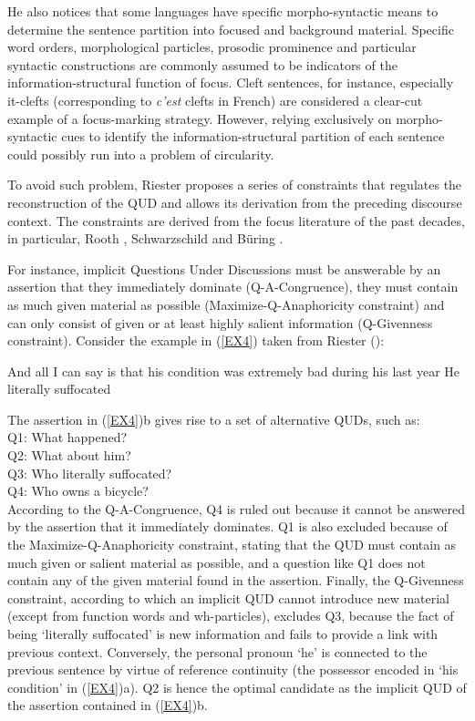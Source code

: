 \documentclass[12pt]{report}
\begin{document}
He also notices that some languages have specific morpho-syntactic means to determine the sentence partition into focused and background material. Specific word orders, morphological particles, prosodic prominence and particular syntactic constructions are commonly assumed to be indicators of the information-structural function of focus. Cleft sentences, for instance, especially it-clefts (corresponding to \textit{c’est} clefts in French) are considered a clear-cut example of a focus-marking strategy. However, relying exclusively on morpho-syntactic cues to identify the information-structural partition of each sentence could possibly run into a problem of circularity.


To avoid such problem, Riester proposes a series of constraints that regulates the reconstruction of the QUD and allows its derivation from the preceding discourse context. The constraints are derived from the focus literature of the past decades, in particular, Rooth \cite{rooth1992theory}, Schwarzschild  \cite{schwarzschild1999givenness} and Büring \cite{Buring:focustypology}.


For instance, implicit Questions Under Discussions must be answerable by an assertion that they immediately dominate (Q-A-Congruence), they must contain as much given material as possible (Maximize-Q-Anaphoricity constraint) and can only consist of given or at least highly salient information (Q-Givenness constraint). Consider the example in (\ref{EX4}) taken from Riester (\cite{riester2019constructing}):


\pex \label{EX4}
\a And all I can say is that his condition was extremely bad during his \vspace{-0,2cm}last year
\vspace{-0,2cm}
\a He literally suffocated
\xe

\noindent
The assertion in (\ref{EX4})b gives rise to a set of alternative QUDs, such as:\\

\noindent
Q1: {What happened?}\\
Q2: {What about him?}\\
Q3: {Who literally suffocated?}\\
Q4: {Who owns a bicycle?}\\ 

\noindent
According to the Q-A-Congruence, Q4 is ruled out because it cannot be answered by the assertion that it immediately dominates. Q1 is also excluded because of the Maximize-Q-Anaphoricity constraint, stating that the QUD must contain as much given or salient material as possible, and a question like Q1 does not contain any of the given material found in the assertion. Finally, the Q-Givenness constraint, according to which an implicit QUD cannot introduce new material (except from function words and wh-particles), excludes Q3, because the fact of being ‘literally suffocated’ is new information and fails to provide a link with previous context. Conversely, the personal pronoun ‘he’ is connected to the previous sentence by virtue of reference continuity (the possessor encoded in ‘his condition' in (\ref{EX4})a). Q2 is hence the optimal candidate as the implicit QUD of the assertion contained in (\ref{EX4})b.
\end{document}

